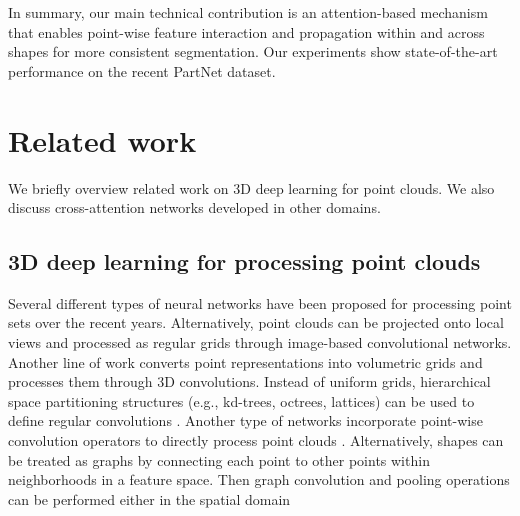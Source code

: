 \documentclass{egpubl}
\begin{document}
In summary, our main technical contribution is an attention-based mechanism that enables point-wise feature interaction and propagation within and across shapes for more consistent segmentation. Our experiments show state-of-the-art performance on the recent PartNet dataset.
 

\section{Related work}
\label{sec:related_work}

We briefly overview related work on 3D deep learning for point clouds. We also discuss cross-attention networks developed in other domains.  

\vspace*{-4mm}
\subsection{3D deep learning for processing point clouds} Several different types of neural networks have been proposed for processing point sets over the recent years.  Alternatively, point clouds can  be projected onto local views 
\cite{su15mvcnn,qi2016volmv,kalogerakis2017shapepfcn,Huang:2017:LMVCNN} and processed as regular grids through image-based convolutional networks. Another line of work converts point representations into volumetric grids 
\cite{wu2015shapenets,maturana_iros_2015,dai2017scannet,rethage2018eccv,Shi_2019_CVPR,Liu2019:pointvoxelcnn} and processes them through 3D convolutions.
Instead of uniform grids, hierarchical space partitioning structures (e.g., kd-trees, octrees, lattices) can be used to define  regular convolutions 
\cite{Riegler2017OctNet,klokov2017escape,wang2017ocnn,Wang:2018:AOP,su18splatnet,Wang:2021}. Another type of networks incorporate point-wise convolution operators to directly process point clouds 
\cite{Li:pointcnn,Hua17,Xie18,liu2019densepoint,accv2018Groh,Atzmon18,Hermosilla18,Wang:parametricconv:18,xu2018spidercnn,Wu18:pointconv,Komarichev2019,Thomas19:kpconv}.
Alternatively, shapes can be treated as graphs by connecting each point to other points within neighborhoods in a feature space. Then graph convolution and pooling operations can be performed either in the spatial domain 
\end{document}
